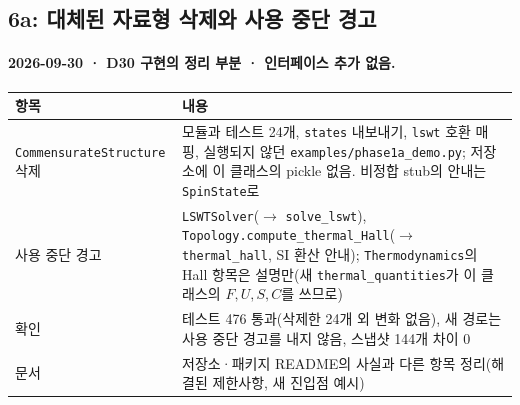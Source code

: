 \subsection{6a: 대체된 자료형 삭제와 사용 중단 경고}\label{stage6a}
\begingroup%
  \framesubtitle{2026-09-30 · D30 구현의 정리 부분 · 인터페이스 추가 없음.}
  \footnotesize\renewcommand{\arraystretch}{1.08}
  \begin{tabularx}{\textwidth}{@{}P{3.2cm}Y@{}}
    \toprule
    항목 & 내용 \\
    \midrule
    \texttt{CommensurateStructure} 삭제 & 모듈과 테스트 24개, \texttt{states} 내보내기, \texttt{lswt} 호환 매핑, 실행되지 않던 \texttt{examples/phase1a\_demo.py}; 저장소에 이 클래스의 pickle 없음. 비정합 stub의 안내는 \texttt{SpinState}로 \\
    사용 중단 경고 & \texttt{LSWTSolver}($\to$ \texttt{solve\_lswt}), \texttt{Topology.compute\_thermal\_Hall}($\to$ \texttt{thermal\_hall}, SI 환산 안내); \texttt{Thermodynamics}의 Hall 항목은 설명만(새 \texttt{thermal\_quantities}가 이 클래스의 $F,U,S,C$를 쓰므로) \\
    확인 & 테스트 476 통과(삭제한 24개 외 변화 없음), 새 경로는 사용 중단 경고를 내지 않음, 스냅샷 144개 차이 0 \\
    문서 & 저장소·패키지 README의 사실과 다른 항목 정리(해결된 제한사항, 새 진입점 예시) \\
    \bottomrule
  \end{tabularx}
\endgroup


